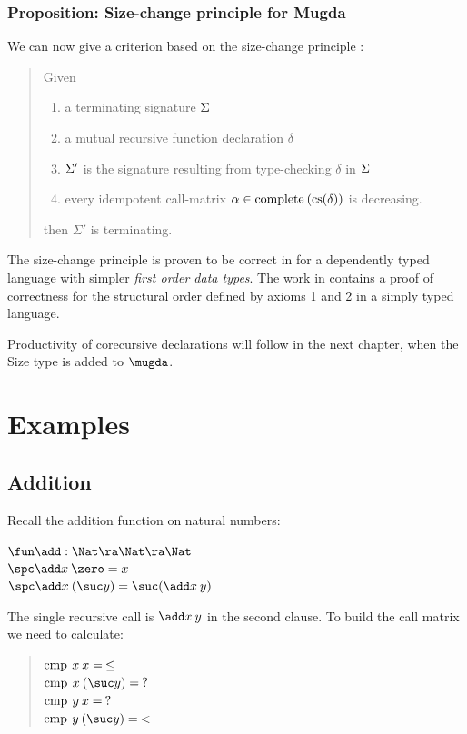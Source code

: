 \subsubsection{Proposition: Size-change principle for Mugda}
We can now give a criterion based on the size-change principle \cite{lee01sizechange}:
\begin{quote}
Given
\begin{enumerate}
\item
a terminating signature $\Sigma$
\item
a mutual recursive function declaration $\delta$
\item
$\Sigma'$ is the signature resulting from type-checking $\delta$ in $\Sigma$
\item
every idempotent call-matrix  $ \alpha \in \operatorname{complete} \: (\operatorname{cs}(\delta))$ is decreasing.
\end{enumerate}
then $\Sigma'$ is terminating.
\end{quote}
\noindent The size-change principle is proven to be correct in \cite{wahlstedt:phd:2007} for a dependently typed language 
with simpler \emph{first order data types}.
The work in \cite{abelAltenkirch:predStRec} contains a proof of correctness for the structural order defined by axioms 1 and 2 in a simply typed language. 

Productivity of corecursive declarations will follow in the next chapter, when the Size type is added to $\mugda$.

\section{Examples}

\subsection{Addition}

Recall the addition function on natural numbers:

\begin{bsp}
$\fun \add : \Nat \ra \Nat \ra \Nat$\\
$\spc \add x \: \zero = x $\\
$\spc \add x \: (\suc y) = \suc (\add x \: y)  $
\end{bsp}
The single recursive call is $\add x \: y$ in the second clause.
To build the call matrix we need to calculate:
\begin{quote}
$\operatorname{cmp} \: x \: x = \: \leq $\\
$\cmp \: x \: (\suc y) = \: ? $\\
$\operatorname{cmp} \: y \: x = \: ? $\\
$\cmp \: y \: (\suc y) = \: < $ 
\end{quote}

